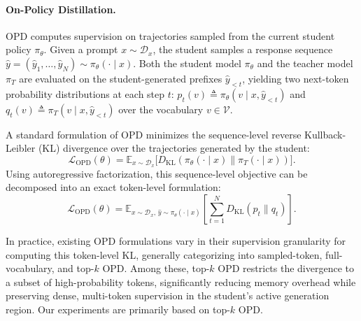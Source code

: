 \paragraph{On-Policy Distillation.} OPD computes supervision on trajectories sampled from the current student policy $\pi_\theta$. Given a prompt $x \sim \mathcal{D}_x$, the student samples a response sequence $\hat{y} = (\hat{y}_1, \dots, \hat{y}_N) \sim \pi_\theta(\cdot \mid x)$. Both the student model $\pi_\theta$ and the teacher model $\pi_T$ are evaluated on the student-generated prefixes $\hat{y}_{<t}$, yielding two next-token probability distributions at each step $t$: $p_t(v) \triangleq \pi_\theta(v \mid x, \hat{y}_{<t})$ and $q_t(v) \triangleq \pi_T(v \mid x, \hat{y}_{<t})$ over the vocabulary $v \in \mathcal{V}$.

A standard formulation of OPD minimizes the sequence-level reverse Kullback-Leibler (KL) divergence over the trajectories generated by the student:
\begin{equation}
\mathcal{L}_{\text{OPD}}(\theta) = \mathbb{E}_{x \sim \mathcal{D}_x} \Big[ D_{\text{KL}}(\pi_\theta(\cdot \mid x) \parallel \pi_T(\cdot \mid x)) \Big].
\end{equation}
Using autoregressive factorization, this sequence-level objective can be decomposed into an exact token-level formulation:
\begin{equation}
\mathcal{L}_{\text{OPD}}(\theta) = \mathbb{E}_{x \sim \mathcal{D}_x, \, \hat{y} \sim \pi_\theta(\cdot \mid x)} \left[ \sum_{t=1}^N D_{\text{KL}}(p_t \parallel q_t) \right].
\end{equation}

In practice, existing OPD formulations vary in their supervision granularity for computing this token-level KL, generally categorizing into sampled-token, full-vocabulary, and top-$k$ OPD. Among these, top-$k$ OPD restricts the divergence to a subset of high-probability tokens, significantly reducing memory overhead while preserving dense, multi-token supervision in the student's active generation region. Our experiments are primarily based on top-$k$ OPD.

